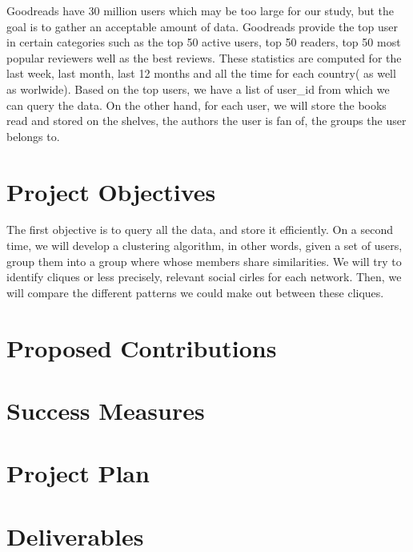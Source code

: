 \documentclass[11pt]{article}
\begin{document}
Goodreads have 30 million users which may be too large for our study, but the goal is to gather an acceptable amount of data. Goodreads provide the top user in certain categories such as the top 50 active users, top 50 readers, top 50 most popular reviewers well as the best reviews. These statistics are computed for the last week, last month, last 12 months and all the time for each country( as well as worlwide).
Based on the top users, we have a list of user_id from which we can query the data. On the other hand, for each user, we will store the books read and stored on the shelves, the authors the user is fan of, the groups the user belongs to.



\section{Project Objectives}
The first objective is to query all the data, and store it efficiently.
On a second time, we will develop a clustering algorithm, in other words, given a set of users, group them into a group where whose members share similarities.
We will try to identify cliques or less precisely, relevant social cirles for each network. Then, we will compare the different patterns we could make out between these cliques.


\section{Proposed Contributions}
\section{Success Measures}
\section{Project Plan}
\section{Deliverables}




\end{document}

